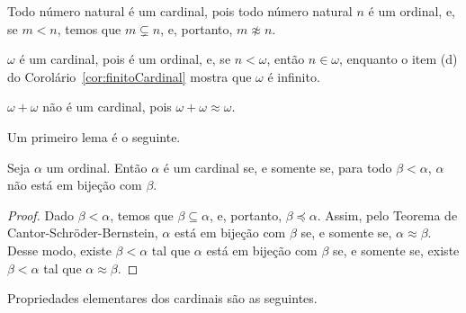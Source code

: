 \begin{example}
    Todo número natural é um cardinal, pois todo número natural $n$ é um ordinal, e, se $m<n$, temos que $m\subsetneq n$, e, portanto, $m\not\approx n$.
\end{example}
\begin{example}
    $\omega$ é um cardinal, pois é um ordinal, e, se $n<\omega$, então $n\in \omega$, enquanto o item (d) do Corolário~\ref{cor:finitoCardinal} mostra que $\omega$ é infinito.
\end{example}
\begin{example}
    $\omega+\omega$ não é um cardinal, pois $\omega+\omega\approx \omega$.
\end{example}

Um primeiro lema é o seguinte.

\begin{lemma}\label{lem:cardinalEquivNaoBijetaComOrdinalMenor}
    Seja $\alpha$ um ordinal.
    Então $\alpha$ é um cardinal se, e somente se, para todo $\beta<\alpha$, $\alpha$ não está em bijeção com $\beta$.
\end{lemma}
\begin{proof}
    Dado $\beta<\alpha$, temos que $\beta\subseteq \alpha$, e, portanto, $\beta\preceq \alpha$.
    Assim, pelo Teorema de Cantor-Schröder-Bernstein, $\alpha$ está em bijeção com $\beta$ se, e somente se, $\alpha\approx \beta$.
    Desse modo, existe $\beta<\alpha$ tal que $\alpha$ está em bijeção com $\beta$ se, e somente se, existe $\beta<\alpha$ tal que $\alpha\approx \beta$.
\end{proof}

Propriedades elementares dos cardinais são as seguintes.

